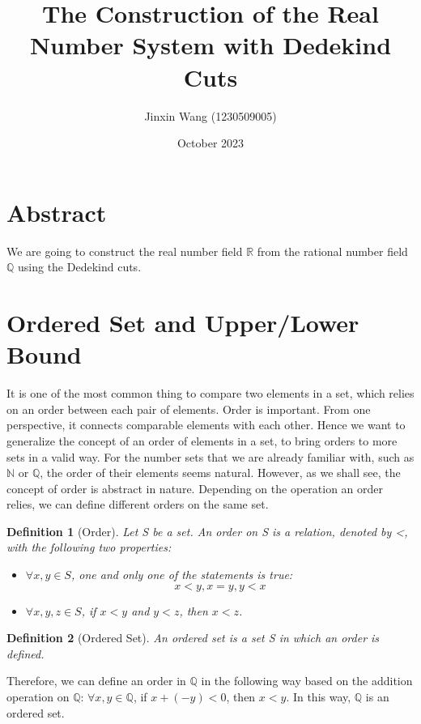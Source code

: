 \documentclass[onecolumn]{article}
\title{The Construction of the Real Number System with Dedekind Cuts}
\author{Jinxin Wang (1230509005)}
\date{October 2023}
\newtheorem{definition}{Definition}
\begin{document}
\maketitle

\section{Abstract}

We are going to construct the real number field $\mathbb{R}$ from the rational 
number field $\mathbb{Q}$ using the Dedekind cuts.

\section{Ordered Set and Upper/Lower Bound}

It is one of the most common thing to compare two elements in a set, which 
relies on an order between each pair of elements. Order is important. From one 
perspective, it connects comparable elements with each other. Hence we want to 
generalize the concept of an order of elements in a set, to bring orders to more 
sets in a valid way. For the number sets that we are already familiar with, such 
as $\mathbb{N}$ or $\mathbb{Q}$, the order of their elements seems natural. 
However, as we shall see, the concept of order is abstract in nature. Depending 
on the operation an order relies, we can define different orders on the same 
set.

\begin{definition}[Order]
  Let S be a set. An order on S is a relation, denoted by <, with the following 
  two properties:
  \begin{itemize}
    \item $\forall x, y \in S$, one and only one of the statements is true:
    \[
      x < y, x = y, y < x
    \]
    \item $\forall x, y, z \in S$, if $x < y$ and $y < z$, then $x < z$.
  \end{itemize}
\end{definition}

\begin{definition}[Ordered Set]
  An ordered set is a set S in which an order is defined.
\end{definition}

Therefore, we can define an order in $\mathbb{Q}$ in the following way based on 
the addition operation on $\mathbb{Q}$: $\forall x, y \in \mathbb{Q}$, if 
$x + (-y) < 0$, then $x < y$. In this way, $\mathbb{Q}$ is an ordered set.
\end{document}
